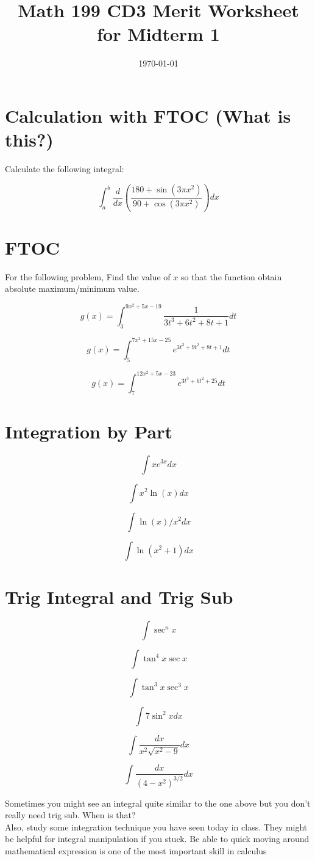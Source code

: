 
\usepackage{fullpage,amsmath,amssymb,amsthm}

\newcommand{\D}{\displaystyle}

\title{Math 199 CD3 Merit Worksheet for Midterm 1}
\date{\today}




\maketitle


	\section{Calculation with FTOC (What is this?)}
		Calculate the following integral:
	\be
	\item $$\int_a^b\frac{d}{dx}\left(\frac{180+\sin(3\pi x^2)}{90+\cos(3\pi x^2)}\right)dx$$
	\vfill
	\ee
	\section{FTOC}

	For the following problem, Find the value of $x$ so that the function obtain absolute maximum/minimum value.
	\be
	\item $$g(x)=\int_3^{9x^2+5x-19}\frac{1}{3t^3+6t^2+8t+1}dt$$
	\vfill
	\item $$g(x)=\int_5^{7x^2+15x-25}e^{3t^3+9t^2+8t+1}dt$$
	\vfill
	\newpage
	\item $$g(x)=\int_7^{12x^2+5x-23}e^{3t^3+6t^2+25}dt$$
	\vfill
	\ee
	\section{Integration by Part}
	\be
	\item $$\int xe^{3x}dx$$
	\vfill
	\item $$\int x^2\ln(x)dx$$
	\vfill
	\newpage

	\item $$\int \ln(x)/x^2dx$$
	\vfill
	\item $$\int \ln(x^2+1)dx$$
	\vfill
	\ee
	\section{Trig Integral and Trig Sub}
	\be 
	\item $$\int \sec^n x$$
	\vfill
	\item $$\int \tan^4x\sec x$$
	\vfill
	\newpage
	\item $$\int \tan^3x\sec^3 x$$
	\vfill
	\item $$\int 7\sin^2xdx$$
	\vfill
	\item $$\int \frac{dx}{x^2\sqrt{x^2-9}}dx$$
	\vfill
	\item $$\int \frac{dx}{(4-x^2)^{3/2}}dx$$
	\vfill
	\item Sometimes you might see an integral quite similar to the one above but you don't really need trig sub. When is that?\\
	\vskip 3cm
	Also, study some integration technique you have seen today in class. They might be helpful for integral manipulation if you stuck. Be able to quick moving around mathematical expression is one of the most important skill in calculus
	\ee

